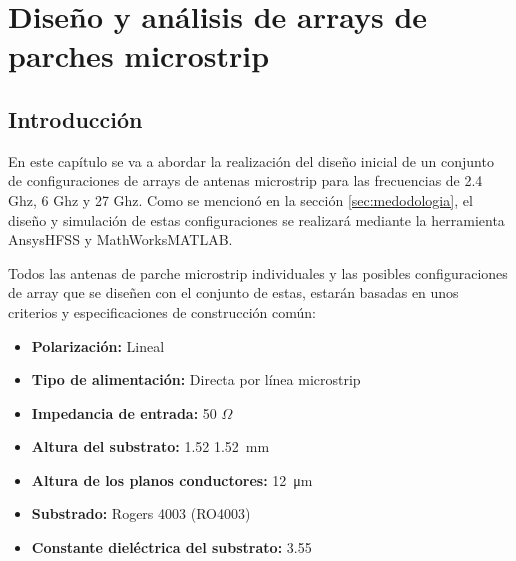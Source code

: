 
\chapter{Diseño y análisis de arrays de parches microstrip}
\label{diseño}

\section{Introducción}

\par En este capítulo se va a abordar la realización del diseño inicial de un conjunto de configuraciones de arrays de antenas microstrip para las frecuencias de 2.4 Ghz, 6 Ghz y 27 Ghz. Como se mencionó en la sección \ref{sec:medodologia}, el diseño y simulación de estas configuraciones se realizará mediante la herramienta Ansys\textregistered HFSS y MathWorks\textregistered  MATLAB.
\\
\par Todos las antenas de parche microstrip individuales y las posibles configuraciones de array que se diseñen con el conjunto de estas, estarán basadas en unos criterios y especificaciones de construcción común:

\begin{itemize}
	\item \textbf{Polarización: }Lineal
	\item \textbf{Tipo de alimentación: } Directa por línea microstrip
	\item \textbf{Impedancia de entrada: }50 $\Omega$
	\item \textbf{Altura del substrato: }1.52 \SI{1.52}{\milli\metre}
	\item \textbf{Altura de los planos conductores: }\SI{12}{\micro\metre} 
	\item \textbf{Substrado: }Rogers 4003 (RO4003)
	\item \textbf{Constante dieléctrica del substrato: }3.55
\end{itemize}

